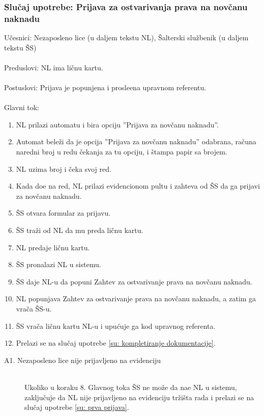 \subsubsection{Slu\v caj upotrebe: Prijava za ostvarivanja prava na nov\v canu naknadu}
\label{su: prijava}
\noindent U\v cesnici: Nezaposleno lice (u daljem tekstu NL), \v Salterski slu\v zbenik (u daljem tekstu \v SS)
\\
\\ Preduslovi: NL ima li\v cnu kartu.
\\
\\ Postuslovi: Prijava je popunjena i prosle\dj ena upravnom referentu.
\\
\\ Glavni tok:
\begin{enumerate}
\item NL prilazi automatu i bira opciju ''Prijava za nov\v canu naknadu''.
\item Automat bele\v zi da je opcija ''Prijava za nov\v canu naknadu'' odabrana, ra\v cuna naredni broj u redu \v cekanja za tu opciju, i \v stampa papir sa brojem.
\item NL uzima broj i \v ceka svoj red.
	\item Kada do\dj e na red, NL prilazi evidencionom pultu i zahteva od \v SS da ga prijavi za nov\v canu naknadu.
	\item \v SS otvara formular za prijavu.
	\item \v SS tra\v zi od NL da mu preda li\v cnu kartu.
	\item NL predaje li\v cnu kartu.
    \item \v SS pronalazi NL u sistemu.
	\item \v SS daje NL-u da popuni Zahtev za ostvarivanje prava na nov\v canu naknadu.
	\item NL popunjava Zahtev za ostvarivanje prava na nov\v canu naknadu, a zatim ga vra\v ca \v SS-u.
	\item \v SS vra\v ca li\v cnu kartu NL-u i upu\' cuje ga kod upravnog referenta.
	\item Prelazi se na slu\v caj upotrebe \ref{su: kompletiranje dokumentacije}.
\end{enumerate}

\begin{description}
	\item[A1. Nezaposleno lice nije prijavljeno na evidenciju] ~\\
	Ukoliko u koraku 8. Glavnog toka \v SS ne mo\v ze da na\dj e NL u sistemu, zaklju\v cuje da NL nije prijavljeno na evidenciju tr\v zi\v sta rada i prelazi se na slu\v caj upotrebe \ref{su: prva prijava}.
\end{description}

